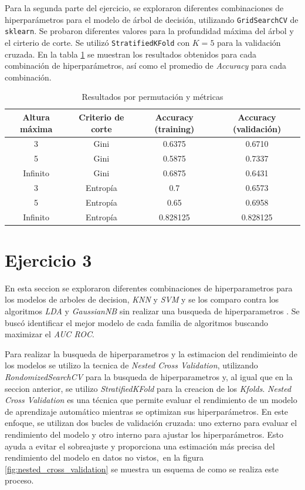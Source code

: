 \documentclass[12pt,a4paper]{article}
\begin{document}
Para la segunda parte del ejercicio, se exploraron diferentes combinaciones de hiperparámetros para el modelo de árbol de decisión, utilizando \texttt{GridSearchCV} de \texttt{sklearn}.
 Se probaron diferentes valores para la profundidad máxima del árbol y el cirterio de corte. Se utilizó \texttt{StratifiedKFold} con $K=5$ para la validación cruzada.
En la tabla \ref{tab:resultados-arbol-gridsearch-1} se muestran los resultados obtenidos para cada combinación de hiperparámetros, así como el promedio de \textit{Accuracy} para cada combinación.
 \begin{table}[H]
    \centering
    \begin{tabular}{|c|c|c|c|}
    \hline
    \textbf{Altura máxima} & \textbf{Criterio de corte} &\textbf{Accuracy} (training) &\textbf{Accuracy} (validación)  \\
    \hline
    3 & Gini   & 0.6375 & 0.6710  \\
    \hline
    5 & Gini & 0.5875 & 0.7337  \\
    \hline
    Infinito & Gini    & 0.6875 & 0.6431 \\
    \hline
    3 & Entropía & 0.7    & 0.6573  \\
    \hline
    5 & Entropía  & 0.65   & 0.6958  \\
    \hline  
    Infinito &  Entropía &  0.828125 &  0.828125 \\
    \hline
    \end{tabular}
    \caption{Resultados por permutación y métricas}
    \label{tab:resultados-arbol-gridsearch-1}
\end{table}

\section{Ejercicio 3}
En esta seccion se exploraron diferentes combinaciones de hiperparametros para los modelos de arboles de decision, \textit{KNN} y \textit{SVM} y se los comparo contra los algoritmos \textit{LDA} y \textit{GaussianNB} sin realizar una busqueda de hiperparametros
. Se buscó identificar el mejor modelo de cada familia de algoritmos buscando maximizar el \textit{AUC ROC}.

Para realizar la busqueda de hiperparametros y la estimacion del rendimieinto de los modelos se utilizo la tecnica de \textit{Nested Cross Validation}, utilizando \textit{RondomizedSearchCV} para la busqueda de hiperparametros y, al igual que en la seccion anterior,
se utilizo \textit{StratifiedKFold} para la creacion de los \textit{Kfolds}.
\textit{Nested Cross Validation} es una técnica que permite evaluar el rendimiento de un modelo de aprendizaje automático mientras se optimizan sus hiperparámetros. En este enfoque, se utilizan dos bucles de validación cruzada: uno externo para evaluar el rendimiento del modelo y otro interno para ajustar los hiperparámetros. Esto ayuda a evitar el sobreajuste
 y proporciona una estimación más precisa del rendimiento del modelo en datos no vistos,~en la figura \ref{fig:nested_cross_validation} se muestra un esquema de como se realiza este proceso.
\end{document}
